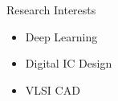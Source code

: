 
\begin{rSection}{Research Interests}
\begin{itemize}
    \item Deep Learning
    \item Digital IC Design
    \item VLSI CAD
\end{itemize}
\end{rSection}




